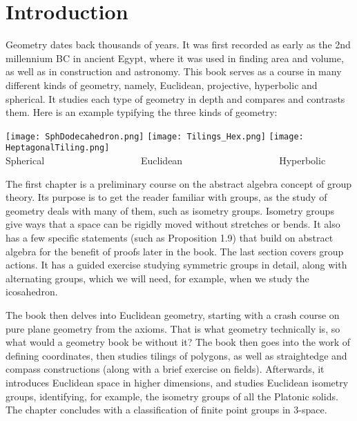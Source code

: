 \documentclass[leqno]{book}
\begin{document}
\section*{Introduction}

Geometry dates back thousands of years.  It was first recorded as early as the 2nd millennium BC in ancient Egypt, where it was used in finding area and volume, as well as in construction and astronomy.  This book serves as a course in many different kinds of geometry, namely, Euclidean, projective, hyperbolic and spherical.  It studies each type of geometry in depth and compares and contrasts them.  Here is an example typifying the three kinds of geometry: %
\begin{center}
\texttt{[image: SphDodecahedron.png]}
\texttt{[image: Tilings\_Hex.png]}
\texttt{[image: HeptagonalTiling.png]}\\
Spherical~~~~~~~~~~~~~~~~~~~~Euclidean~~~~~~~~~~~~~~~~~~~~Hyperbolic
\end{center}

The first chapter is a preliminary course on the abstract algebra concept of group theory.  Its purpose is to get the reader familiar with groups, as the study of geometry deals with many of them, such as isometry groups.  Isometry groups give ways that a space can be rigidly moved without stretches or bends.  It also has a few specific statements (such as Proposition 1.9) that build on abstract algebra for the benefit of proofs later in the book.  The last section covers group actions.  It has a guided exercise studying symmetric groups in detail, along with alternating groups, which we will need, for example, when we study the icosahedron.

The book then delves into Euclidean geometry, starting with a crash course on pure plane geometry from the axioms.  That is what geometry technically is, so what would a geometry book be without it?  The book then goes into the work of defining coordinates, then studies tilings of polygons, as well as straightedge and compass constructions (along with a brief exercise on fields).  Afterwards, it introduces Euclidean space in higher dimensions, and studies Euclidean isometry groups, identifying, for example, the isometry groups of all the Platonic solids.  The chapter concludes with a classification of finite point groups in 3-space.
\end{document}
